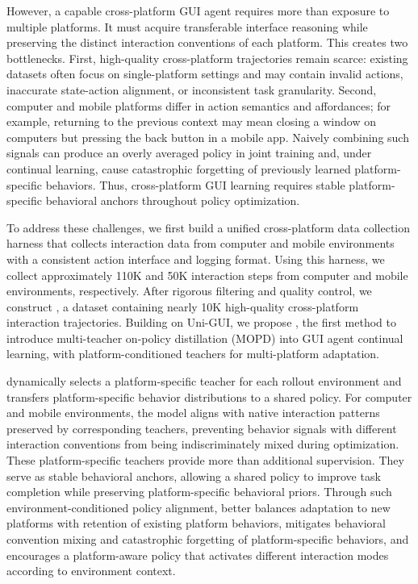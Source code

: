 However, a capable cross-platform GUI agent requires more than exposure
to multiple platforms. It must acquire transferable interface reasoning
while preserving the distinct interaction conventions of each platform.
This creates two bottlenecks. First, high-quality cross-platform
trajectories remain scarce: existing datasets often focus on
single-platform settings and may contain invalid actions, inaccurate
state-action alignment, or inconsistent task granularity. Second,
computer and mobile platforms differ in action semantics and affordances;
for example, returning to the previous context may mean closing a window
on computers but pressing the back button in a mobile app. Naively
combining such signals can produce an overly averaged policy in joint
training and, under continual learning, cause catastrophic forgetting of
previously learned platform-specific behaviors.
Thus, cross-platform GUI learning requires stable platform-specific
behavioral anchors throughout policy optimization.

To address these challenges, we first build a unified cross-platform
data collection harness that collects interaction data from computer and
mobile environments with a consistent action interface and logging format.
Using this harness, we collect approximately 110K and 50K interaction
steps from computer and mobile environments, respectively. After rigorous
filtering and quality control, we construct \BENCH, a dataset
containing nearly 10K high-quality cross-platform interaction trajectories.
Building on Uni-GUI, we propose \METHODNAME, the first method to 
introduce multi-teacher on-policy distillation (MOPD) into GUI agent continual learning, 
with platform-conditioned teachers for multi-platform adaptation.


\METHODNAME dynamically selects a platform-specific teacher for each
rollout environment and transfers platform-specific behavior distributions
to a shared policy. For computer and mobile environments, the model aligns
with native interaction patterns preserved by corresponding teachers,
preventing behavior signals with different interaction conventions from
being indiscriminately mixed during optimization. These platform-specific
teachers provide more than additional supervision. They serve as stable
behavioral anchors, allowing a shared policy to improve task completion
while preserving platform-specific behavioral priors. Through such
environment-conditioned policy alignment, \METHODNAME better balances
adaptation to new platforms with retention of existing platform behaviors,
mitigates behavioral convention mixing and catastrophic forgetting of
platform-specific behaviors, and encourages a
platform-aware policy that activates different interaction modes according
to environment context.




